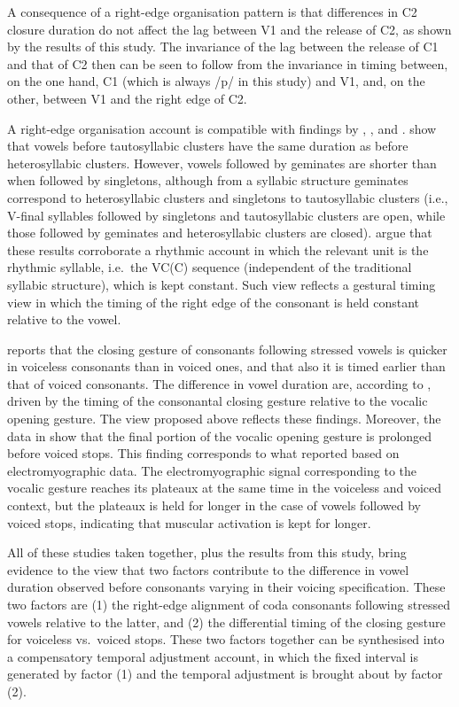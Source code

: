 \documentclass[preprint]{JASAnew}
\begin{document}
A consequence of a right-edge organisation pattern is that differences
in C2 closure duration do not affect the lag between V1 and the release
of C2, as shown by the results of this study. The invariance of the lag
between the release of C1 and that of C2 then can be seen to follow from
the invariance in timing between, on the one hand, C1 (which is always
/p/ in this study) and V1, and, on the other, between V1 and the right
edge of C2.

A right-edge organisation account is compatible with findings by
\citet{raphael1975}, \citet{de-jong1991}, and \citet{celata2018}.
\citet{celata2018} show that vowels before tautosyllabic clusters have
the same duration as before heterosyllabic clusters. However, vowels
followed by geminates are shorter than when followed by singletons,
although from a syllabic structure geminates correspond to
heterosyllabic clusters and singletons to tautosyllabic clusters (i.e.,
V-final syllables followed by singletons and tautosyllabic clusters are
open, while those followed by geminates and heterosyllabic clusters are
closed). \citet{celata2018} argue that these results corroborate a
rhythmic account in which the relevant unit is the rhythmic syllable,
i.e.~the VC(C) sequence (independent of the traditional syllabic
structure), which is kept constant. Such view reflects a gestural timing
view in which the timing of the right edge of the consonant is held
constant relative to the vowel.

\citet{de-jong1991} reports that the closing gesture of consonants
following stressed vowels is quicker in voiceless consonants than in
voiced ones, and that also it is timed earlier than that of voiced
consonants. The difference in vowel duration are, according to
\citet{de-jong1991}, driven by the timing of the consonantal closing
gesture relative to the vocalic opening gesture. The view proposed above
reflects these findings. Moreover, the data in \citet{de-jong1991} show
that the final portion of the vocalic opening gesture is prolonged
before voiced stops. This finding corresponds to what
\citet{raphael1975} reported based on electromyographic data. The
electromyographic signal corresponding to the vocalic gesture reaches
its plateaux at the same time in the voiceless and voiced context, but
the plateaux is held for longer in the case of vowels followed by voiced
stops, indicating that muscular activation is kept for longer.

All of these studies taken together, plus the results from this study,
bring evidence to the view that two factors contribute to the difference
in vowel duration observed before consonants varying in their voicing
specification. These two factors are (1) the right-edge alignment of
coda consonants following stressed vowels relative to the latter, and
(2) the differential timing of the closing gesture for voiceless
vs.~voiced stops. These two factors together can be synthesised into a
compensatory temporal adjustment account, in which the fixed interval is
generated by factor (1) and the temporal adjustment is brought about by
factor (2).
\end{document}
